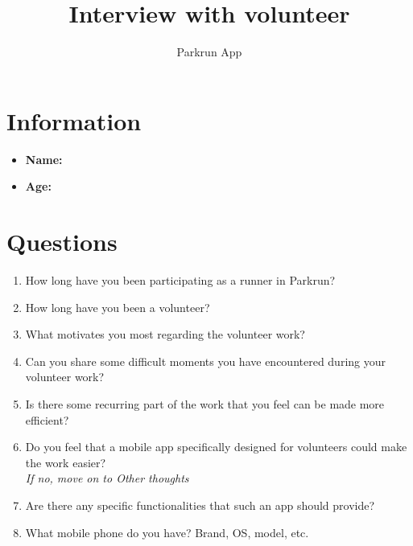 \documentclass{article}
\title{\textbf{Interview with volunteer}}
\author{Parkrun App}
\date{}
\begin{document}
\maketitle
\thispagestyle{empty}
\section*{Information}
\begin{itemize}[label=]
    \item \textbf{Name:} 
    \item \textbf{Age:} 
\end{itemize}
\thispagestyle{empty}
\section*{Questions}
\begin{enumerate}[label=\textbf{Question \arabic*:}]
    \item How long have you been participating as a runner in Parkrun?\\
        \vspace{2cm}
    \item How long have you been a volunteer?\\
        \vspace{2cm}
    \item What motivates you most regarding the volunteer work?\\
        \vspace{2cm}
    \item Can you share some difficult moments you have encountered during your volunteer work?\\
        \vspace{2cm}
    \item Is there some recurring part of the work that you feel can be made more efficient?\\
        \vspace{2cm}
    \item Do you feel that a mobile app specifically designed for volunteers could make the work easier?\\
    \textit{If no, move on to Other thoughts}\\
        \vspace{2cm}
    \item Are there any specific functionalities that such an app should provide?\\
        \vspace{2cm}
    \item What mobile phone do you have? Brand, OS, model, etc. \\
        \vspace{2cm}
\end{enumerate}
\thispagestyle{empty}
\newpage
\end{document}
